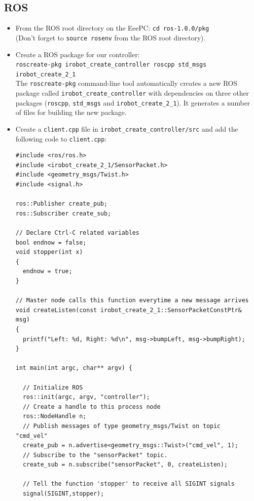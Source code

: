\subsection{ROS}

\begin{itemize}

\item From the ROS root directory on the EeePC: \texttt{cd ros-1.0.0/pkg}\\
(Don't forget to \texttt{source rosenv} from the ROS root directory).

\item Create a ROS package for our controller:\\
\texttt{roscreate-pkg irobot\_create\_controller roscpp std\_msgs irobot\_create\_2\_1}\\
The \texttt{roscreate-pkg} command-line tool automatically creates a new ROS package called \texttt{irobot\_create\_controller} with dependencies on three other packages (\texttt{roscpp}, \texttt{std\_msgs} and \texttt{irobot\_create\_2\_1}). It generates a number of files for building the new package.

\item Create a \texttt{client.cpp} file in \texttt{irobot\_create\_controller/src} and add the following code to \texttt{client.cpp}:

\begin{verbatim}
#include <ros/ros.h>
#include <irobot_create_2_1/SensorPacket.h>
#include <geometry_msgs/Twist.h>
#include <signal.h>

ros::Publisher create_pub;
ros::Subscriber create_sub;

// Declare Ctrl-C related variables
bool endnow = false;
void stopper(int x)
{
  endnow = true;
}

// Master node calls this function everytime a new message arrives
void createListen(const irobot_create_2_1::SensorPacketConstPtr& msg)
{
  printf("Left: %d, Right: %d\n", msg->bumpLeft, msg->bumpRight);  
}

int main(int argc, char** argv) {

  // Initialize ROS
  ros::init(argc, argv, "controller");
  // Create a handle to this process node
  ros::NodeHandle n;
  // Publish messages of type geometry_msgs/Twist on topic "cmd_vel"
  create_pub = n.advertise<geometry_msgs::Twist>("cmd_vel", 1);
  // Subscribe to the "sensorPacket" topic.
  create_sub = n.subscribe("sensorPacket", 0, createListen);

  // Tell the function 'stopper' to receive all SIGINT signals	
  signal(SIGINT,stopper);


\end{verbatim}
\end{itemize}
